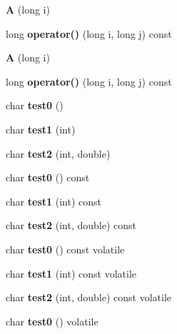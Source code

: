 \begin{DoxyCompactItemize}
{\bfseries A} (long i)
\item 
\mbox{\label{struct_a_a82a55c3fc46f9cbb74868e6794d9ddf0}} 
long {\bfseries operator()} (long i, long j) const
\item 
\mbox{\label{struct_a_a770cd2af7b6878f9d1ab52ed28536341}} 
{\bfseries A} (long i)
\item 
\mbox{\label{struct_a_a82a55c3fc46f9cbb74868e6794d9ddf0}} 
long {\bfseries operator()} (long i, long j) const
\item 
\mbox{\label{struct_a_aef22665f99644834b2038e12b809e7ec}} 
char {\bfseries test0} ()
\item 
\mbox{\label{struct_a_a81c5b28145e28b1b585eca6d9f0e8b3a}} 
char {\bfseries test1} (int)
\item 
\mbox{\label{struct_a_acb7fbe0cec3a384ff19679f7ef74a015}} 
char {\bfseries test2} (int, double)
\item 
\mbox{\label{struct_a_a46c4426713a7b849dc02d3326782cb3f}} 
char {\bfseries test0} () const
\item 
\mbox{\label{struct_a_a734664f713b03bcbefe264edc8dcc031}} 
char {\bfseries test1} (int) const
\item 
\mbox{\label{struct_a_a951b1cbfdb2937efa1b78f3ff374758e}} 
char {\bfseries test2} (int, double) const
\item 
\mbox{\label{struct_a_a85ebb2bd280f0b07bf077c6b14c0320f}} 
char {\bfseries test0} () const volatile
\item 
\mbox{\label{struct_a_a54bda4faa25227e6cc200f9b65db705c}} 
char {\bfseries test1} (int) const volatile
\item 
\mbox{\label{struct_a_a9bb00acc07de749811915e214ed9da61}} 
char {\bfseries test2} (int, double) const volatile
\item 
\mbox{\label{struct_a_a09b76f54cec503a9965c64b09520921c}} 
char {\bfseries test0} () volatile

\end{DoxyCompactItemize}

